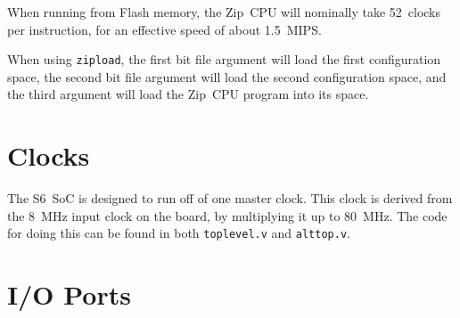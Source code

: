\documentclass{gqtekspec}
\begin{document}
When running from Flash memory, the Zip~CPU will nominally take 52~clocks per
instruction, for an effective speed of about 1.5~MIPS.

When using {\tt zipload}, the first bit file argument will load the first
configuration space, the second bit file argument will load the second
configuration space, and the third argument will load the Zip~CPU program
into its space.

\chapter{Clocks}

The S6~SoC is designed to run off of one master clock.  This clock is derived
from the 8~MHz input clock on the board, by multiplying it up to 80~MHz.  The
code for doing this can be found in both {\tt toplevel.v} and {\tt alttop.v}.

\chapter{I/O Ports}
\end{document}
